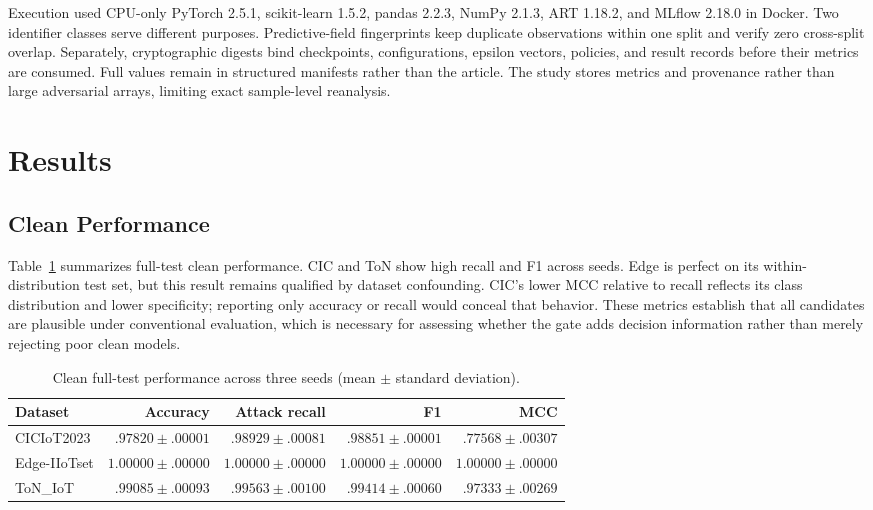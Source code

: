 \documentclass[runningheads]{llncs}
\begin{document}
Execution used CPU-only PyTorch 2.5.1, scikit-learn 1.5.2, pandas 2.2.3, NumPy 2.1.3, ART 1.18.2, and MLflow 2.18.0 in Docker. Two identifier classes serve different purposes. Predictive-field fingerprints keep duplicate observations within one split and verify zero cross-split overlap. Separately, cryptographic digests bind checkpoints, configurations, epsilon vectors, policies, and result records before their metrics are consumed. Full values remain in structured manifests rather than the article. The study stores metrics and provenance rather than large adversarial arrays, limiting exact sample-level reanalysis.

\section{Results}
\subsection{Clean Performance}
Table~\ref{tab:clean} summarizes full-test clean performance. CIC and ToN show high recall and F1 across seeds. Edge is perfect on its within-distribution test set, but this result remains qualified by dataset confounding. CIC's lower MCC relative to recall reflects its class distribution and lower specificity; reporting only accuracy or recall would conceal that behavior. These metrics establish that all candidates are plausible under conventional evaluation, which is necessary for assessing whether the gate adds decision information rather than merely rejecting poor clean models.

\begin{table}[t]
\caption{Clean full-test performance across three seeds (mean $\pm$ standard deviation).}
\label{tab:clean}
\centering
\begin{tabular}{lrrrr}
\toprule
Dataset & Accuracy & Attack recall & F1 & MCC\\
\midrule
CICIoT2023 & $.97820\pm.00001$ & $.98929\pm.00081$ & $.98851\pm.00001$ & $.77568\pm.00307$\\
Edge-IIoTset & $1.00000\pm.00000$ & $1.00000\pm.00000$ & $1.00000\pm.00000$ & $1.00000\pm.00000$\\
ToN\_IoT & $.99085\pm.00093$ & $.99563\pm.00100$ & $.99414\pm.00060$ & $.97333\pm.00269$\\
\bottomrule
\end{tabular}
\end{table}
\end{document}
